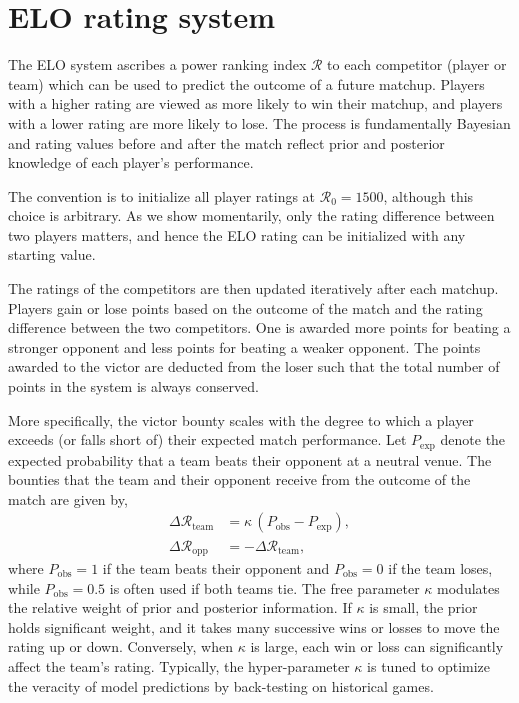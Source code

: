 \documentclass[aps,prc,reprint,amsmath,superscriptaddress]{revtex4-1}
\begin{document}
\section{ELO rating system}

The ELO system ascribes a power ranking index $\mathcal{R}$ to each competitor (player or team) which can be used to predict the outcome of a future matchup.
Players with a higher rating are viewed as more likely to win their matchup, and players with a lower rating are more likely to lose.
The process is fundamentally Bayesian and rating values before and after the match reflect prior and posterior knowledge of each player's performance.

The convention is to initialize all player ratings at ${\mathcal{R}_0 = 1500}$, although this choice is arbitrary.
As we show momentarily, only the rating difference between two players matters, and hence the ELO rating can be initialized with any starting value.

The ratings of the competitors are then updated iteratively after each matchup.
Players gain or lose points based on the outcome of the match and the rating difference between the two competitors.
One is awarded more points for beating a stronger opponent and less points for beating a weaker opponent.
The points awarded to the victor are deducted from the loser such that the total number of points in the system is always conserved.

More specifically, the victor bounty scales with the degree to which a player exceeds (or falls short of) their expected match performance.
Let $P_\text{exp}$ denote the expected probability that a team beats their opponent at a neutral venue.
The bounties that the team and their opponent receive from the outcome of the match are given by,
\begin{align}
  \Delta \mathcal{R}_\text{team} &= \kappa \,(P_\text{obs} - P_\text{exp}),\\
  \Delta \mathcal{R}_\text{opp} &= -\Delta \mathcal{R}_\text{team},
\end{align}
where ${P_\text{obs}=1}$ if the team beats their opponent and ${P_\text{obs}=0}$ if the team loses, while $P_\text{obs}=0.5$ is often used if both teams tie.
The free parameter $\kappa$ modulates the relative weight of prior and posterior information. 
If $\kappa$ is small, the prior holds significant weight, and it takes many successive wins or losses to move the rating up or down.
Conversely, when $\kappa$ is large, each win or loss can significantly affect the team's rating.
Typically, the hyper-parameter $\kappa$ is tuned to optimize the veracity of model predictions by back-testing on historical games.
\end{document}
